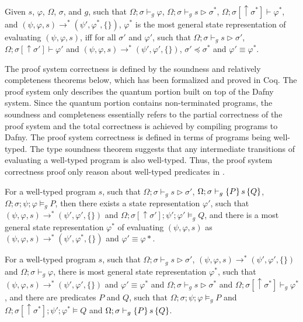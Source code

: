 \begin{definition}\label{def:most-gen}\rm 
  Given $s$, $\varphi$, $\Omega$, $\sigma$, and $g$, such that $\Omega;\sigma\vdash_g \varphi$, $\Omega;\sigma\vdash_g s \triangleright \sigma^*$, $\Omega;\sigma[\uparrow \sigma^*]\vdash \varphi^*$, and $(\psi,\varphi,s) \longrightarrow^{*} (\psi',\varphi^*,\{\})$, $\varphi^*$ is the most general state representation of evaluating $(\psi,\varphi,s)$, iff for all $\sigma'$ and $\varphi'$, such that $\Omega;\sigma\vdash_g s \triangleright \sigma'$, $\Omega;\sigma[\uparrow \sigma']\vdash \varphi'$ and $(\psi,\varphi,s) \longrightarrow^{*} (\psi',\varphi',\{\})$, $\sigma' \preceq \sigma^*$ and $\varphi' \equiv \varphi^*$.
\end{definition}

The \qafny proof system correctness is defined by the soundness and relatively completeness theorems below, which has been formalized and proved in Coq. The \qafny proof system only describes the quantum portion built on top of the Dafny system. Since the quantum portion contains non-terminated programs, the soundness and completeness essentially refers to the partial correctness of the \qafny proof system and the total correctness is achieved by compiling \qafny programs to Dafny. The \qafny proof system correctness is defined in terms of programs being well-typed. The type soundness theorem suggests that any intermediate transitions of evaluating a well-typed \qafny program is also well-typed. Thus, the proof system correctness proof only reason about well-typed predicates in .


\begin{theorem}\label{thm:proof-soundness}\rm 
For a well-typed program $s$, such that $\Omega;\sigma\vdash_g s \triangleright \sigma'$, $\Omega;\sigma\vdash_{g}\{P\}\, s \,\{Q\}$, $\Omega;\sigma;\psi;\varphi\models_g P$, then there exists a state representation $\varphi'$, such that $(\psi,\varphi,s)\longrightarrow^* (\psi',\varphi',\{\})$ and $\Omega;\sigma[\uparrow\sigma'];\psi';\varphi'\models_g Q$, and there is a most general state representation $\varphi^*$ of evaluating $(\psi,\varphi,s)$ as $(\psi,\varphi,s)\longrightarrow^* (\psi',\varphi^*,\{\})$ and $\varphi' \equiv \varphi*$.
\end{theorem}

\begin{theorem}\label{thm:proof-completeness}\rm 
For a well-typed program $s$, such that $\Omega;\sigma\vdash_g s \triangleright \sigma'$, $(\psi,\varphi,s)\longrightarrow^* (\psi',\varphi',\{\})$ and $\Omega;\sigma\vdash_g \varphi$, there is most general state representation $\varphi^*$, such that $(\psi,\varphi,s)\longrightarrow^* (\psi',\varphi',\{\})$ and $\varphi' \equiv \varphi^*$ and $\Omega;\sigma\vdash_g s \triangleright \sigma^*$ and $\Omega;\sigma[\uparrow \sigma^*]\vdash_g \varphi^*$, and there are predicates $P$ and $Q$, such that $\Omega;\sigma;\psi;\varphi\models_g P$ and $\Omega;\sigma[\uparrow\sigma^*];\psi';\varphi^* \models Q$ and $\Omega;\sigma\vdash_{g}\{P\}\, s \,\{Q\}$.
\end{theorem}




